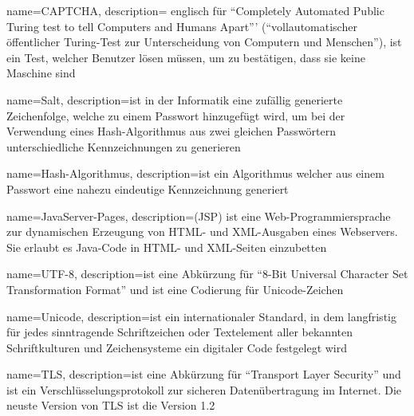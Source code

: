 {
	name=CAPTCHA,
	description={
		englisch für "`Completely Automated Public Turing test to tell Computers and Humans Apart"'' ("`vollautomatischer öffentlicher Turing-Test zur Unterscheidung von Computern und Menschen"'), ist ein Test, welcher Benutzer lösen müssen, um zu bestätigen, dass sie keine Maschine sind
	}
}



{
	name=Salt,
	description={ist in der Informatik eine zufällig generierte Zeichenfolge, welche zu einem Passwort  hinzugefügt wird, um bei der Verwendung eines Hash-Algorithmus aus zwei gleichen Passwörtern unterschiedliche Kennzeichnungen zu generieren}
}

{
	name={Hash-Algorithmus},
	description={ist ein Algorithmus welcher aus einem Passwort eine nahezu eindeutige Kennzeichnung generiert}
}

{
	name={JavaServer-Pages},
	description={(JSP) ist eine Web-Programmiersprache zur dynamischen Erzeugung von HTML- und XML-Ausgaben eines Webservers. Sie erlaubt es Java-Code in HTML- und XML-Seiten einzubetten}
}

{
	name={UTF-8},
	description={ist eine Abkürzung für "`8-Bit Universal Character Set Transformation Format"' und ist eine Codierung für \gls{Unicode}-Zeichen}
}

{
	name={Unicode},
	description={ist ein internationaler Standard, in dem langfristig für jedes sinntragende Schriftzeichen oder Textelement aller bekannten Schriftkulturen und Zeichensysteme ein digitaler Code festgelegt wird}
}

{
	name={TLS},
	description={ist eine Abkürzung für "`Transport Layer Security"' und ist ein Verschlüsselungsprotokoll zur sicheren Datenübertragung im Internet. Die neuste Version von \gls{TLS} ist die Version 1.2}
}